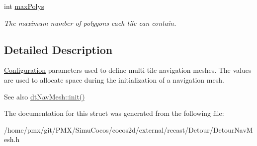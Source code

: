 \begin{DoxyCompactItemize}
\mbox{\label{structdtNavMeshParams_a4f44babd04fff4f8300ecd15d4237375}} 
int \hyperlink{structdtNavMeshParams_a4f44babd04fff4f8300ecd15d4237375}{max\+Polys}
\begin{DoxyCompactList}\small\item\em The maximum number of polygons each tile can contain. \end{DoxyCompactList}\end{DoxyCompactItemize}


\subsection{Detailed Description}
\hyperlink{classConfiguration}{Configuration} parameters used to define multi-\/tile navigation meshes. The values are used to allocate space during the initialization of a navigation mesh. \begin{DoxySeeAlso}{See also}
\hyperlink{classdtNavMesh_a020702938951249972b955a65967234a}{dt\+Nav\+Mesh\+::init()} 
\end{DoxySeeAlso}


The documentation for this struct was generated from the following file\+:\begin{DoxyCompactItemize}
\item 
/home/pmx/git/\+P\+M\+X/\+Simu\+Cocos/cocos2d/external/recast/\+Detour/Detour\+Nav\+Mesh.\+h\end{DoxyCompactItemize}
